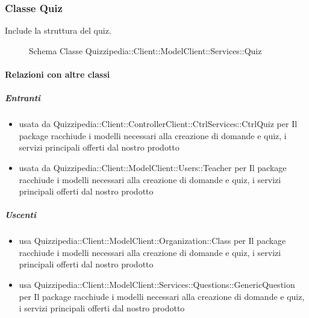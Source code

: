 \subsubsection{Classe Quiz}
Include la struttura del quiz.
\begin{figure}[H]
\centering
\noindent{}
\caption[Schema Classe Quiz]{Schema Classe Quizzipedia::Client::ModelClient::Services::Quiz}
\end{figure}
\paragraph{Relazioni con altre classi}
\subparagraph{Entranti}
\begin{itemize}
\item usata da Quizzipedia::Client::ControllerClient::CtrlServices::CtrlQuiz per Il package racchiude i modelli necessari alla creazione di domande e quiz, i servizi principali offerti dal nostro prodotto
\item usata da Quizzipedia::Client::ModelClient::Users::Teacher per Il package racchiude i modelli necessari alla creazione di domande e quiz, i servizi principali offerti dal nostro prodotto
\end{itemize}
\subparagraph{Uscenti}
\begin{itemize}
\item usa Quizzipedia::Client::ModelClient::Organization::Class per Il package racchiude i modelli necessari alla creazione di domande e quiz, i servizi principali offerti dal nostro prodotto
\item usa Quizzipedia::Client::ModelClient::Services::Questions::GenericQuestion per Il package racchiude i modelli necessari alla creazione di domande e quiz, i servizi principali offerti dal nostro prodotto
\end{itemize}
